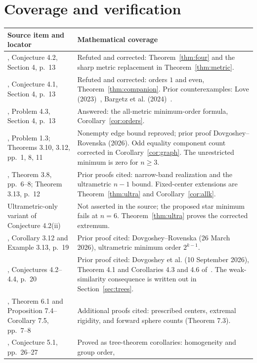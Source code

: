 \documentclass[11pt]{article}
\begin{document}
\section{Coverage and verification}
\small
\begin{longtable}{@{}>{\raggedright\arraybackslash}p{.34\linewidth}>{\raggedright\arraybackslash}p{.59\linewidth}@{}}
\toprule
Source item and locator & Mathematical coverage\\
\midrule
\endhead
\cite{DR}, Conjecture 4.2, Section 4, p.~13 &
Refuted and corrected: Theorem~\ref{thm:four} and the sharp metric
replacement in Theorem~\ref{thm:metric}.\\[3pt]
\cite{DR}, Conjecture 4.1, Section 4, p.~13 &
Refuted and corrected: orders $1$ and even, Theorem~\ref{thm:companion}.
Prior counterexamples: Love (2023)~\cite{L}, Bargetz et al. (2024)~\cite{BBKL}.\\[3pt]
\cite{DR}, Problem 4.3, Section 4, p.~13 &
Answered: the all-metric minimum-order formula, Corollary~\ref{cor:orders}.\\[3pt]
\cite{DR}, Problem 1.3; Theorems 3.10, 3.12, pp.~1, 8, 11 &
Nonempty edge bound reproved; prior proof Dovgoshey--Rovenska (2026).
Odd equality component count corrected in Corollary~\ref{cor:graph}.
The unrestricted minimum is zero for $n\ge3$.\\[3pt]
\cite{DR}, Theorem 3.8, pp.~6--8; Theorem 3.13, p.~12 &
Prior proofs cited: narrow-band realization and the ultrametric
$n-1$ bound. Fixed-center extensions are
Theorem~\ref{thm:ultra} and Corollary~\ref{cor:allk}.\\[3pt]
Ultrametric-only variant of Conjecture 4.2(ii) &
Not asserted in the source; the proposed star minimum fails at $n=6$.
Theorem~\ref{thm:ultra} proves the corrected extremum.\\[3pt]
\cite{UM}, Corollary 3.12 and Example 3.13, p.~19 &
Prior proof cited: Dovgoshey--Rovenska (26 March 2026), ultrametric
minimum order $2^{k-1}$.\\[3pt]
\cite{UM}, Conjectures 4.2--4.4, p.~20 &
Prior proof cited: Dovgoshey et al. (10 September 2026),
Theorem 4.1 and Corollaries 4.3 and 4.6 of~\cite{BT}.
The weak-similarity consequence is written out in Section~\ref{sec:trees}.\\[3pt]
\cite{KSI}, Theorem 6.1 and Proposition 7.4--Corollary 7.5, pp.~7--8 &
Additional proofs cited: prescribed centers, extremal rigidity,
and forward sphere counts (Theorem 7.3).\\[3pt]
\cite{BT}, Conjecture 5.1, pp.~26--27 &
Proved as tree-theorem corollaries: homogeneity and group order,

\end{longtable}
\end{document}
